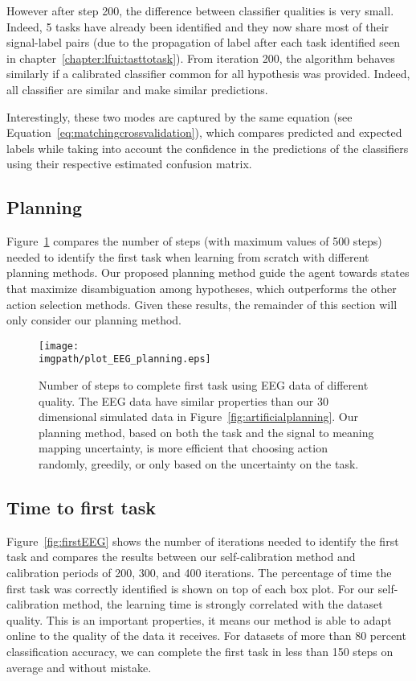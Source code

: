However after step 200, the difference between classifier qualities is very small. Indeed, 5 tasks have already been identified and they now share most of their signal-label pairs (due to the propagation of label after each task identified seen in chapter~\ref{chapter:lfui:tasttotask}). From iteration 200, the algorithm behaves similarly if a calibrated classifier common for all hypothesis was provided. Indeed,  all classifier are similar and make similar predictions.

Interestingly, these two modes are captured by the same equation (see Equation~\ref{eq:matchingcrossvalidation}), which compares predicted and expected labels while taking into account the confidence in the predictions of the classifiers using their respective estimated confusion matrix.

\subsection{Planning}

Figure~\ref{fig:planningEEG} compares the number of steps (with maximum values of 500 steps) needed to identify the first task when learning from scratch with different planning methods. Our proposed planning method guide the agent towards states that maximize disambiguation among hypotheses, which outperforms the other action selection methods. Given these results, the remainder of this section will only consider our planning method.

\begin{figure}[!htbp]
    \centering
    \texttt{[image: \\imgpath/plot\_EEG\_planning.eps]}
    \caption{Number of steps to complete first task using EEG data of different quality. The EEG data have similar properties than our 30 dimensional simulated data in Figure~\ref{fig:artificialplanning}. Our planning method, based on both the task and the signal to meaning mapping uncertainty, is more efficient that choosing action randomly, greedily, or only based on the uncertainty on the task.}
    \label{fig:planningEEG}
\end{figure}

\subsection{Time to first task}

Figure~\ref{fig:firstEEG} shows the number of iterations needed to identify the first task and compares the results between our self-calibration method and calibration periods of 200, 300, and 400 iterations. The percentage of time the first task was correctly identified is shown on top of each box plot. For our self-calibration method, the learning time is strongly correlated with the dataset quality. This is an important properties, it means our method is able to adapt online to the quality of the data it receives. For datasets of more than 80 percent classification accuracy, we can complete the first task in less than 150 steps on average and without mistake.

